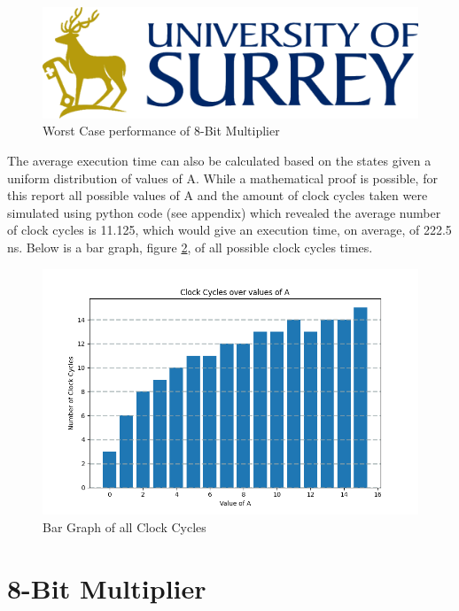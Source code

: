 \documentclass[11pt]{article}
\begin{document}
\begin{figure}[H]        
    \centering
    \includegraphics[width=\textwidth]{Logo.png}
    \caption{Worst Case performance of 8-Bit Multiplier}
    \label{fig:4bit_worstcase}
\end{figure} 

The average execution time can also be calculated based on the states given a uniform distribution of values of A. 
While a mathematical proof is possible, for this report all possible values of A and the amount of clock cycles taken were simulated using python code (see appendix)
which revealed the average number of clock cycles is 11.125, which would give an execution time, on average, of 222.5 ns.
Below is a bar graph, figure \ref{fig:bar}, of all possible clock cycles times.

\begin{figure}[H]        
    \centering
    \includegraphics[width=\textwidth]{ClockCycles.png}
    \caption{Bar Graph of all Clock Cycles}
    \label{fig:bar}
\end{figure} 

\section{8-Bit Multiplier}
\end{document}
